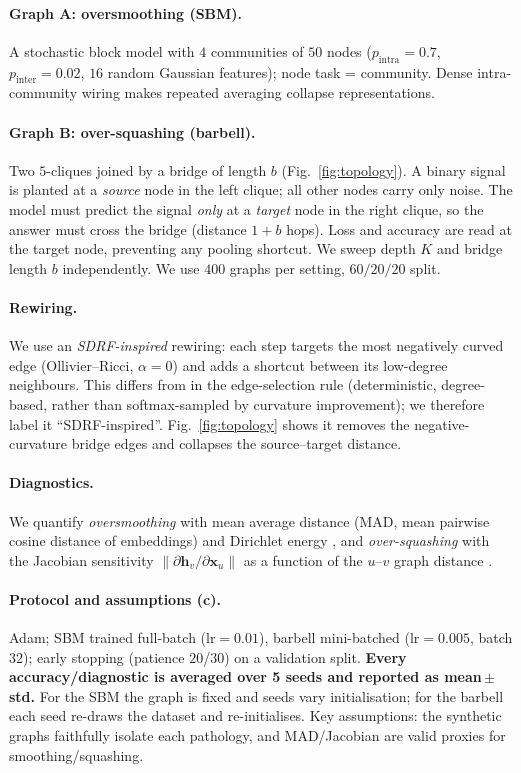 \documentclass[10pt,a4paper]{article}
\begin{document}
\paragraph{Graph A: oversmoothing (SBM).}
A stochastic block model with $4$ communities of $50$ nodes ($p_{\text{intra}}{=}0.7$,
$p_{\text{inter}}{=}0.02$, $16$ random Gaussian features); node task = community.
Dense intra-community wiring makes repeated averaging collapse representations.

\paragraph{Graph B: over-squashing (barbell).}
Two $5$-cliques joined by a bridge of length $b$ (Fig.~\ref{fig:topology}). A binary
signal is planted at a \emph{source} node in the left clique; all other nodes carry
only noise. The model must predict the signal \emph{only} at a \emph{target} node in
the right clique, so the answer must cross the bridge (distance $1{+}b$ hops). Loss
and accuracy are read at the target node, preventing any pooling shortcut. We sweep
depth $K$ and bridge length $b$ independently. We use $400$ graphs per setting,
$60/20/20$ split.

\paragraph{Rewiring.}
We use an \emph{SDRF-inspired} rewiring: each step targets the most negatively
curved edge (Ollivier--Ricci, $\alpha{=}0$) and adds a shortcut between its
low-degree neighbours. This differs from \cite{topping2022} in the edge-selection
rule (deterministic, degree-based, rather than softmax-sampled by curvature
improvement); we therefore label it ``SDRF-inspired''. Fig.~\ref{fig:topology}
shows it removes the negative-curvature bridge edges and collapses the source--target
distance.

\paragraph{Diagnostics.}
We quantify \emph{oversmoothing} with mean average distance
(MAD, mean pairwise cosine distance of embeddings) and Dirichlet energy
\cite{li2018deeper,rusch2023survey}, and \emph{over-squashing} with the Jacobian
sensitivity $\lVert\partial \bm h_v/\partial \bm x_u\rVert$ as a function of the
$u$--$v$ graph distance \cite{topping2022,digiovanni2023}.

\paragraph{Protocol and assumptions (c).}
Adam; SBM trained full-batch ($\text{lr}=0.01$), barbell mini-batched
($\text{lr}=0.005$, batch $32$); early stopping (patience $20$/$30$) on a validation
split. \textbf{Every accuracy/diagnostic is averaged over 5 seeds and reported as
mean\,$\pm$\,std.} For the SBM the graph is fixed and seeds vary initialisation; for
the barbell each seed re-draws the dataset and re-initialises. Key assumptions: the
synthetic graphs faithfully isolate each pathology, and MAD/Jacobian are valid
proxies for smoothing/squashing.
\end{document}
